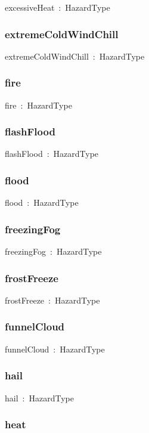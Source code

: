 \documentclass{article}
\begin{document}
excessiveHeat~:~HazardType

\subsubsection*{extremeColdWindChill}

extremeColdWindChill~:~HazardType

\subsubsection*{fire}

fire~:~HazardType

\subsubsection*{flashFlood}

flashFlood~:~HazardType

\subsubsection*{flood}

flood~:~HazardType

\subsubsection*{freezingFog}

freezingFog~:~HazardType

\subsubsection*{frostFreeze}

frostFreeze~:~HazardType

\subsubsection*{funnelCloud}

funnelCloud~:~HazardType

\subsubsection*{hail}

hail~:~HazardType

\subsubsection*{heat}
\end{document}
